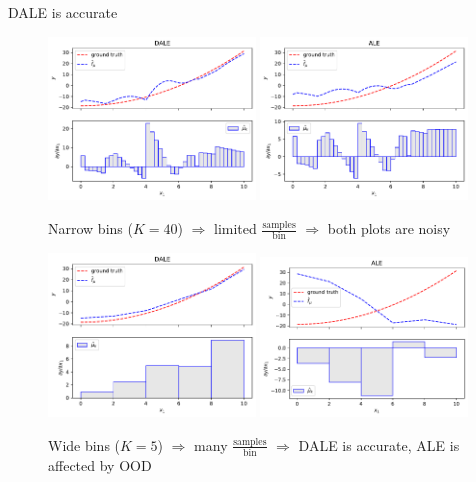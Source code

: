 \documentclass[final]{beamer}
\newlength{\colwidth}
\begin{document}
\begin{frame}[t]
\begin{columns}[t]
\begin{column}{\colwidth}
\begin{block}{DALE is accurate}
    \begin{figure}
      \centering
      \includegraphics[width=0.49\textwidth]{./../ACML-presentation/figures/dale_40_bins.pdf}
      \includegraphics[width=0.49\textwidth]{./../ACML-presentation/figures/ale_40_bins.pdf}
      \caption{Narrow bins (\(K=40\)) \(\Rightarrow\) limited
        \(\frac{\text{samples}}{\text{bin}}\) \(\Rightarrow\) both plots are noisy }
      \label{fig:acc-1}
    \end{figure}

    \begin{figure} \centering
      \includegraphics[width=0.49\textwidth]{./../ACML-presentation/figures/dale_5_bins.pdf}
      \includegraphics[width=0.49\textwidth]{./../ACML-presentation/figures/ale_5_bins.pdf}
      \caption{Wide bins (\(K=5\)) \(\Rightarrow\) many
        \(\frac{\text{samples}}{\text{bin}}\) \(\Rightarrow\) DALE is
        accurate, ALE is affected by OOD}
    \end{figure}
  \end{block}


\end{column}
\end{columns}
\end{frame}
\end{document}
